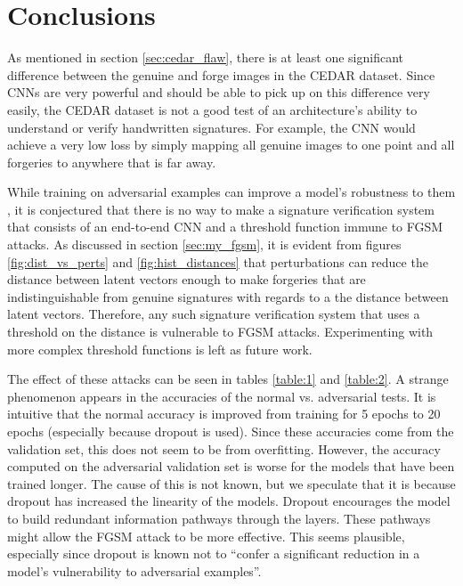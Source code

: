 \section{Conclusions}\label{sec:conclusion}

As mentioned in section \ref{sec:cedar_flaw}, there is at least one significant difference between the genuine and forge images in the CEDAR dataset.
Since CNNs are very powerful and should be able to pick up on this difference very easily, the CEDAR dataset is not a good test of an architecture's ability to understand or verify handwritten signatures.
For example, the CNN would achieve a very low loss by simply mapping all genuine images to one point and all forgeries to anywhere that is far away.

While training on adversarial examples can improve a model's robustness to them \cite{goodfellow}, it is conjectured that there is no way to make a signature verification system that consists of an end-to-end CNN and a threshold function immune to FGSM attacks.
As discussed in section \ref{sec:my_fgsm}, it is evident from figures \ref{fig:dist_vs_perts} and \ref{fig:hist_distances} that perturbations can reduce the distance between latent vectors enough to make forgeries that are indistinguishable from genuine signatures with regards to a the distance between latent vectors.
Therefore, any such signature verification system that uses a threshold on the distance is vulnerable to FGSM attacks.
Experimenting with more complex threshold functions is left as future work.

The effect of these attacks can be seen in tables \ref{table:1} and \ref{table:2}.
A strange phenomenon appears in the accuracies of the normal vs. adversarial tests.
It is intuitive that the normal accuracy is improved from training for 5 epochs to 20 epochs (especially because dropout is used).
Since these accuracies come from the validation set, this does not seem to be from overfitting.
However, the accuracy computed on the adversarial validation set is worse for the models that have been trained longer.
The cause of this is not known, but we speculate that it is because dropout has increased the linearity of the models.
Dropout encourages the model to build redundant information pathways through the layers.
These pathways might allow the FGSM attack to be more effective.
This seems plausible, especially since dropout is known not to ``confer a significant reduction in a model's vulnerability to adversarial examples''\cite{goodfellow}.

